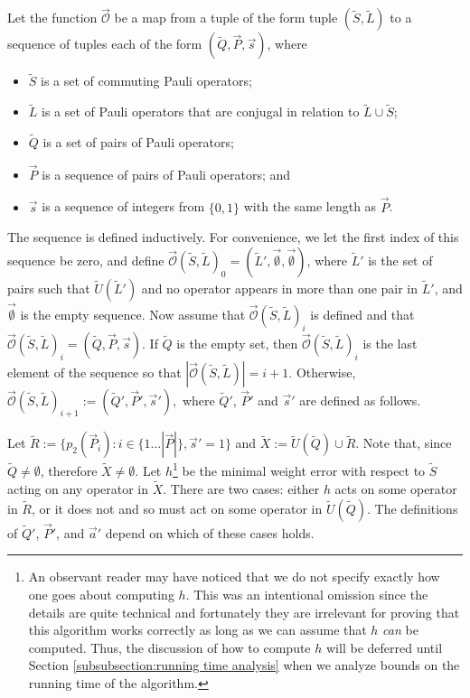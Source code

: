 \documentclass[twocolumn,showpacs,preprintnumbers,amsmath,amssymb,nofootinbib,pra,floatfix]{revtex4-1}
\newenvironment{definition}[1][Definition]{\begin{trivlist}
\item[\hskip \labelsep {\bfseries #1}]}{\end{trivlist}}
\newcommand{\lst}{\vec}
\newcommand{\set}{\tilde}
\newcommand{\optimizer}{\lst{\mathcal{O}}}
\begin{document}
\begin{definition}
Let the function $\optimizer$ be a map from a tuple of the form tuple $(\set S,\set L)$ to a sequence of tuples each of the form $(\set Q,\lst P,\lst s)$, where
\begin{itemize}
\item $\set S$ is a set of commuting Pauli operators;
\item $\set L$ is a set of Pauli operators that are conjugal in relation to $\set L\cup\set S$;
\item $\set Q$ is a set of pairs of Pauli operators;
\item $\lst P$ is a sequence of pairs of Pauli operators; and
\item $\lst s$ is a sequence of integers from $\{0,1\}$ with the same length as $\lst P$.
\end{itemize}

The sequence is defined inductively.  For convenience, we let the first index of this sequence be zero, and define $\optimizer(\set S,\set L)_0=(\set L',\lst\emptyset,\lst\emptyset)$, where $\set L'$ is the set of pairs such that $\set U(\set L')$ and no operator appears in more than one pair in $\set L'$, and $\lst\emptyset$ is the empty sequence.  Now assume that $\optimizer(\set S,\set L)_i$ is defined and that $\optimizer(\set S,\set L)_i=(\set Q,\lst P,\lst s)$.  If $\set Q$ is the empty set, then $\optimizer(\set S,\set L)_i$ is the last element of the sequence so that $|\optimizer(\set S,\set L)|=i+1$.  Otherwise, $\optimizer(\set S,\set L)_{i+1}:=(\set Q',\lst P',\lst s'),$ where $\set Q'$, $\lst P'$ and $\lst s'$ are defined as follows.

Let $\set R:=\{p_2(\lst P_i):i\in\{1\dots |\lst P|\},\lst s'=1\}$ and $\set X:=\set U(\set Q)\cup\set R$.  Note that, since $\set Q\ne\emptyset$, therefore $\set X\ne\emptyset$.  Let $h$\footnote{An observant reader may have noticed that we do not specify exactly how one goes about computing $h$.  This was an intentional omission since the details are quite technical and fortunately they are irrelevant for proving that this algorithm works correctly as long as we can assume that $h$ \emph{can} be computed.  Thus, the discussion of how to compute $h$ will be deferred until Section \ref{subsubsection:running time analysis} when we analyze bounds on the running time of the algorithm.} be the minimal weight error with respect to $\set S$ acting on any operator in $\set X$.  There are two cases: either $h$ acts on some operator in $\set R$, or it does not and so must act on some operator in $\set U(\set Q)$.  The definitions of $\set Q'$, $\lst P'$, and $\lst a'$ depend on which of these cases holds.


\end{definition}
\end{document}
